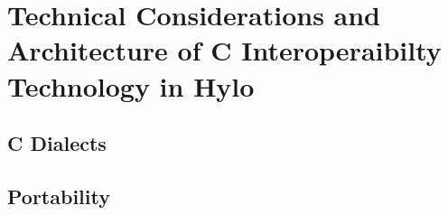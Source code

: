 \section{Technical Considerations and Architecture of C Interoperaibilty Technology in Hylo}

\subsection{C Dialects}

\bigbreak \bigbreak \bigbreak
\bigbreak \bigbreak \bigbreak
\bigbreak \bigbreak \bigbreak
\bigbreak \bigbreak \bigbreak
\bigbreak \bigbreak \bigbreak
\bigbreak \bigbreak \bigbreak
\bigbreak \bigbreak \bigbreak
\bigbreak \bigbreak \bigbreak
\bigbreak \bigbreak \bigbreak
\bigbreak \bigbreak \bigbreak
\bigbreak \bigbreak \bigbreak
\bigbreak \bigbreak \bigbreak
\bigbreak \bigbreak \bigbreak
\bigbreak \bigbreak \bigbreak
\bigbreak \bigbreak \bigbreak
\bigbreak \bigbreak \bigbreak
\bigbreak \bigbreak \bigbreak
\bigbreak \bigbreak \bigbreak
\bigbreak \bigbreak \bigbreak
\bigbreak \bigbreak \bigbreak
\bigbreak \bigbreak \bigbreak
\bigbreak \bigbreak \bigbreak
\bigbreak \bigbreak \bigbreak
\bigbreak \bigbreak \bigbreak
\bigbreak \bigbreak \bigbreak
\bigbreak \bigbreak \bigbreak
\bigbreak \bigbreak \bigbreak
\bigbreak \bigbreak \bigbreak
\bigbreak \bigbreak \bigbreak

\subsection{Portability}
\bigbreak \bigbreak \bigbreak
\bigbreak \bigbreak \bigbreak
\bigbreak \bigbreak \bigbreak
\bigbreak \bigbreak \bigbreak
\bigbreak \bigbreak \bigbreak
\bigbreak \bigbreak \bigbreak
\bigbreak \bigbreak \bigbreak
\bigbreak \bigbreak \bigbreak
\bigbreak \bigbreak \bigbreak
\bigbreak \bigbreak \bigbreak
\bigbreak \bigbreak \bigbreak
\bigbreak \bigbreak \bigbreak
\bigbreak \bigbreak \bigbreak
\bigbreak \bigbreak \bigbreak
\bigbreak \bigbreak \bigbreak
\bigbreak \bigbreak \bigbreak
\bigbreak \bigbreak \bigbreak
\bigbreak \bigbreak \bigbreak
\bigbreak \bigbreak \bigbreak
\bigbreak \bigbreak \bigbreak
\bigbreak \bigbreak \bigbreak
\bigbreak \bigbreak \bigbreak
\bigbreak \bigbreak \bigbreak
\bigbreak \bigbreak \bigbreak
\bigbreak \bigbreak \bigbreak
\bigbreak \bigbreak \bigbreak
\bigbreak \bigbreak \bigbreak
\bigbreak \bigbreak \bigbreak
\bigbreak \bigbreak \bigbreak

